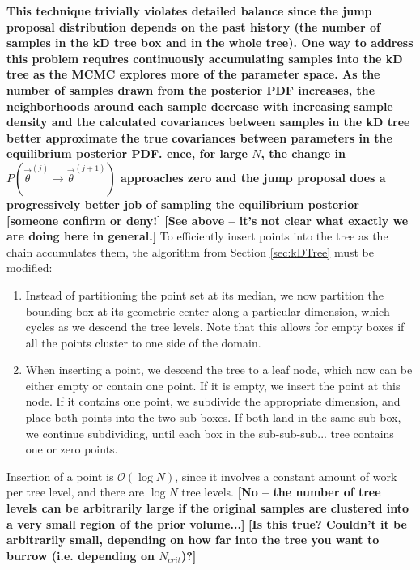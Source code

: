 \documentclass{iopart}
\newcommand{\vtheta}{\vec{\theta}}
\newcommand{\ilya}[1]{{\color{red} \bf #1}}
\newcommand{\dan}[1]{{\color{magenta} \bf #1}}
\newcommand{\order}[1]{\mathcal{O}\left( #1 \right)}
\begin{document}
\dan{This technique trivially violates detailed balance since the jump proposal distribution depends on the past history (the number of samples in the kD tree box and in the whole tree). One way to address this problem requires continuously accumulating samples into the kD tree as the MCMC explores more
of the parameter space. As the number of samples drawn from the posterior PDF increases, the neighborhoods around each sample decrease with increasing sample density and the calculated covariances between samples in the kD tree better approximate the true covariances between parameters in the equilibrium posterior PDF. ence, for large $N$, the change in $P(\vtheta^{(j)} \rightarrow \vtheta^{(j+1)})$ approaches zero and the jump proposal does a progressively better job of sampling the equilibrium posterior [someone confirm or deny!]}  \ilya{[See above -- it's not clear what exactly we are doing here in general.]}
To efficiently insert points into the tree as the chain accumulates them,
the algorithm from Section \ref{sec:kDTree} must be modified:
\begin{enumerate}
\item Instead of partitioning the point set at its median, we now
  partition the bounding box at its geometric center along a
  particular dimension, which cycles as we descend the tree levels.
  Note that this allows for empty boxes if all the points cluster to
  one side of the domain.
\item When inserting a point, we descend the tree to a leaf node,
  which now can be either empty or contain one point.  If it is empty,
  we insert the point at this node.  If it contains one point, we
  subdivide the appropriate dimension, and place both points into the
  two sub-boxes.  If both land in the same sub-box, we continue
  subdividing, until each box in the sub-sub-sub... tree contains one
  or zero points.
\end{enumerate}
Insertion of a point is $\order{\log N}$, since it involves a constant
amount of work per tree level, and there are $\log N$ tree levels.  \ilya{[No -- the number of tree levels can be arbitrarily large if the original samples are clustered into a very small region of the prior volume...]} \dan{[Is this true? Couldn't it be arbitrarily small, depending on how far into the tree you want to burrow (i.e. depending on $N_{crit}$)?]}
\end{document}
